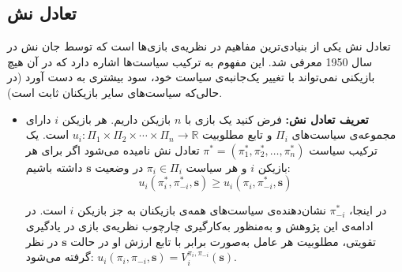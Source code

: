 \subsection{تعادل نش}
تعادل نش
 یکی از بنیادی‌ترین مفاهیم در نظریه‌ی بازی‌ها است که توسط جان نش در سال 1950 معرفی شد. این مفهوم به ترکیب
  سیاست‌ها اشاره دارد که در آن هیچ بازیکنی نمی‌تواند با تغییر یک‌جانبه‌ی سیاست خود، سود بیشتری به دست آورد (در حالی‌که سیاست‌های سایر بازیکنان ثابت است).

\begin{itemize}
	\item \textbf{تعریف تعادل نش:}
	فرض کنید یک بازی با \( n \) بازیکن داریم. هر بازیکن \( i \) دارای مجموعه‌ی سیاست‌های \( \Pi_i \) و تابع مطلوبیت \( u_i: \Pi_1 \times \Pi_2 \times \cdots \times \Pi_n \rightarrow \mathbb{R} \) است. یک ترکیب سیاست \( \pi^* = (\pi_1^*, \pi_2^*, \ldots, \pi_n^*) \) تعادل نش نامیده می‌شود اگر برای هر بازیکن \( i \) و هر سیاست \( \pi_i \in \Pi_i \)
	 در وضعیت \(\boldsymbol{s}\)
	 داشته باشیم:
\begin{equation}
		u_i(\pi_i^*, \pi_{-i}^*, \boldsymbol{s}) \geq u_i(\pi_i, \pi_{-i}^*, \boldsymbol{s})
\end{equation}
	
	در اینجا، \( \pi_{-i}^* \) نشان‌دهنده‌ی سیاست‌های همه‌ی بازیکنان به جز بازیکن \( i \) است. در ادامه‌ی این پژوهش و به‌منظور به‌کارگیری چارچوب نظریه‌ی بازی در یادگیری تقویتی، مطلوبیت هر عامل به‌صورت برابر با تابع ارزش او در حالت \(\boldsymbol{s}\) در نظر گرفته می‌شود:
	\(u_i(\pi_i, \pi_{-i}, \boldsymbol{s}) = V_i^{\pi_i, \pi_{-i}}(\boldsymbol{s})\).
\end{itemize}

